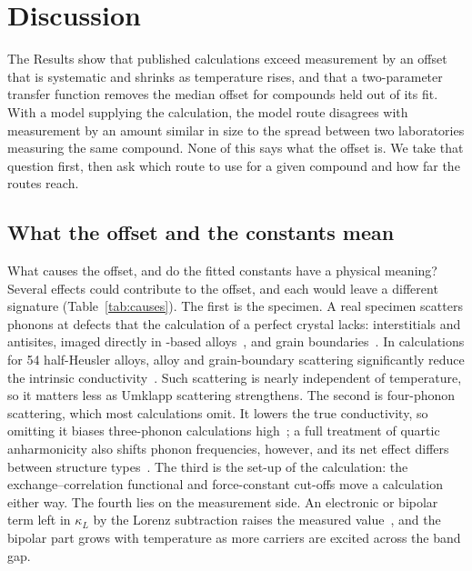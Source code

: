 
\section{Discussion}
\label{sec:discussion}

The Results show that published calculations exceed measurement by an offset that is systematic
and shrinks as temperature rises, and that a two-parameter transfer function removes the median
offset for compounds held out of its fit. With a model supplying the calculation, the model route
disagrees with measurement by an amount similar in size to the spread between two laboratories
measuring the same compound. None of this says what the offset is. We take that question first,
then ask which route to use for a given compound and how far the routes reach.

\subsection{What the offset and the constants mean}
\label{sec:interpretation}

What causes the offset, and do the fitted constants have a physical meaning? Several effects could
contribute to the offset, and each would leave a different signature (Table~\ref{tab:causes}). The
first is the specimen. A real specimen scatters phonons at defects that the calculation of a
perfect crystal lacks: interstitials and antisites, imaged directly in -based
alloys~\cite{kim2017direct}, and grain boundaries~\cite{schrade2017the}. In calculations for
\num{54} half-Heusler alloys, alloy and grain-boundary scattering significantly reduce the
intrinsic conductivity~\cite{berland2019thermoelec}. Such scattering is nearly independent of
temperature, so it matters less as Umklapp scattering strengthens. The second is four-phonon
scattering, which most calculations omit. It lowers the true conductivity, so omitting it biases
three-phonon calculations high~\cite{feng2017fourphonon}; a full treatment of quartic
anharmonicity also shifts phonon frequencies, however, and its net effect differs between
structure types~\cite{xia2020highthroug}. The third is the set-up of the calculation: the
exchange--correlation functional and force-constant cut-offs move a calculation either way. The
fourth lies on the measurement side. An electronic or bipolar term left in $\kappa_L$ by the
Lorenz subtraction raises the measured value~\cite{thesberg2017on,li2015synthesis}, and the
bipolar part grows with temperature as more carriers are excited across the band gap.

